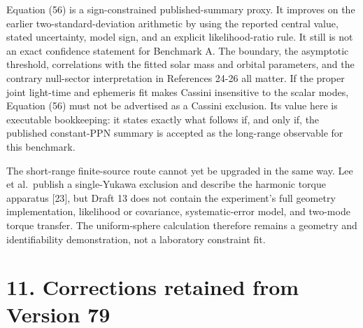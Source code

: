 \documentclass[
  american,
  11pt,
  letterpaper,
]{article}
\begin{document}
Equation (56) is a sign-constrained published-summary proxy. It improves on the earlier two-standard-deviation arithmetic by using the reported central value, stated uncertainty, model sign, and an explicit likelihood-ratio rule. It still is not an exact confidence statement for Benchmark A. The boundary, the asymptotic threshold, correlations with the fitted solar mass and orbital parameters, and the contrary null-sector interpretation in References 24-26 all matter. If the proper joint light-time and ephemeris fit makes Cassini insensitive to the scalar modes, Equation (56) must not be advertised as a Cassini exclusion. Its value here is executable bookkeeping: it states exactly what follows if, and only if, the published constant-PPN summary is accepted as the long-range observable for this benchmark.

The short-range finite-source route cannot yet be upgraded in the same way. Lee et al.~publish a single-Yukawa exclusion and describe the harmonic torque apparatus {[}23{]}, but Draft 13 does not contain the experiment's full geometry implementation, likelihood or covariance, systematic-error model, and two-mode torque transfer. The uniform-sphere calculation therefore remains a geometry and identifiability demonstration, not a laboratory constraint fit.

\section{11. Corrections retained from Version 79}\label{corrections-retained-from-version-79}
\end{document}
